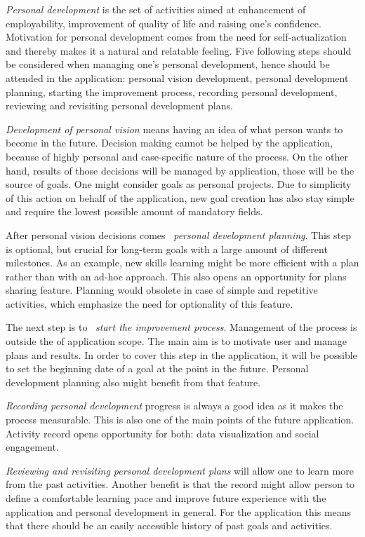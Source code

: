 \textit{Personal development} is the set of activities aimed at enhancement of employability, improvement of quality of life and raising one's confidence.\cite{what-is-personal-development}
Motivation for personal development comes from the need for self-actualization and thereby makes it a natural and relatable feeling.
Five following steps should be considered when managing one's personal development, hence should be attended in the application:
personal vision development, personal development planning, starting the improvement process, recording personal development, reviewing and revisiting personal development plans.

\textit{Development of personal vision} means having an idea of what person wants to become in the future.
Decision making cannot be helped by the application, because of highly personal and case-specific nature of the process.
On the other hand, results of those decisions will be managed by application, those will be the source of goals.
One might consider goals as personal projects.
Due to simplicity of this action on behalf of the application, new goal creation has also stay simple and require the lowest possible amount of mandatory fields.

After personal vision decisions comes ~\textit{personal development planning}.
This step is optional, but crucial for long-term goals with a large amount of different milestones.
As an example, new skills learning might be more efficient with a plan rather than with an ad-hoc approach.
This also opens an opportunity for plans sharing feature.
Planning would obsolete in case of simple and repetitive activities, which emphasize the need for optionality of this feature.

The next step is to ~\textit{start the improvement process}.
Management of the process is outside the of application scope.
The main aim is to motivate user and manage plans and results.
In order to cover this step in the application, it will be possible to set the beginning date of a goal at the point in the future.
Personal development planning also might benefit from that feature.

\textit{Recording personal development} progress is always a good idea as it makes the process measurable.
This is also one of the main points of the future application.
Activity record opens opportunity for both: data visualization and social engagement.

\textit{Reviewing and revisiting personal development plans} will allow one to learn more from the past activities.
Another benefit is that the record might allow person to define a comfortable learning pace and improve future experience with the application and personal development in general.
For the application this means that there should be an easily accessible history of past goals and activities.

